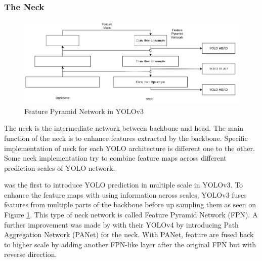     \subsubsection{The Neck}
  
    \begin{figure}[H]
        \centering
        \includegraphics[scale=0.6]{figures/yolo-architecture-rough.png}
        \caption{Feature Pyramid Network in YOLOv3}
        \label{fig:yolofpn}
    \end{figure}

    The neck is the intermediate network between backbone and head.
    The main function of the neck is to enhance features extracted by the backbone.
    Specific implementation of neck for each YOLO architecture is different one to the other.
    Some neck implementation try to combine feature maps across different prediction scales of YOLO network.

    \textcite{yolov3} was the first to introduce YOLO prediction in multiple scale in YOLOv3.
    To enhance the feature maps with using information across scales, YOLOv3 fuses features 
    from multiple parts of the backbone before up sampling them as seen on Figure \ref{fig:yolofpn}. 
    This type of neck network is called Feature Pyramid Network (FPN). 
    A further improvement was made by \textcite{yolov4} with their YOLOv4 by introducing Path 
    Aggregation Network (PANet) for the neck. 
    With PANet, feature are fused back to higher scale by adding another FPN-like layer after the original FPN
    but with reverse direction.
  
  
